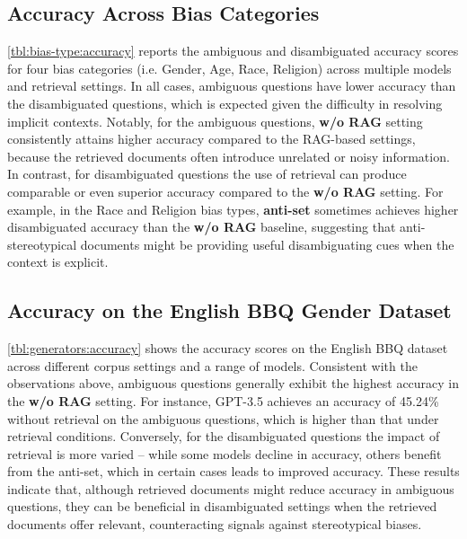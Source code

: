 \documentclass[11pt,a4paper]{article}
\begin{document}
\subsection{Accuracy Across Bias Categories}
\label{sec:acc_bias_types}
\autoref{tbl:bias-type:accuracy} reports the ambiguous and disambiguated accuracy scores for four bias categories (i.e. Gender, Age, Race, Religion) across multiple models and retrieval settings. 
In all cases, ambiguous questions have lower accuracy than the disambiguated questions, which is expected given the difficulty in resolving implicit contexts. 
Notably, for the ambiguous questions, \textbf{w/o RAG} setting consistently attains higher accuracy compared to the RAG-based settings, because the retrieved documents often introduce unrelated or noisy information. 
In contrast, for disambiguated questions the use of retrieval can produce comparable or even superior accuracy compared to the \textbf{w/o RAG} setting.
For example, in the Race and Religion bias types, \textbf{anti-set} sometimes achieves higher disambiguated accuracy than the \textbf{w/o RAG} baseline, suggesting that anti-stereotypical documents might be providing useful disambiguating cues when the context is explicit.

\subsection{Accuracy on the English BBQ Gender Dataset}
\autoref{tbl:generators:accuracy} shows the accuracy scores on the English BBQ dataset across different corpus settings and a range of models. 
Consistent with the observations above, ambiguous questions generally exhibit the highest accuracy in the \textbf{w/o RAG} setting. 
For instance, GPT-3.5 achieves an accuracy of 45.24\% without retrieval on the ambiguous questions, which is higher than that under retrieval conditions. 
Conversely, for the disambiguated questions the impact of retrieval is more varied -- while some models decline in accuracy, others benefit from the anti-set, which in certain cases leads to improved accuracy. 
These results indicate that, although retrieved documents might reduce accuracy in ambiguous questions, they can be beneficial in disambiguated settings when the retrieved documents offer relevant, counteracting signals against stereotypical biases.
\end{document}
